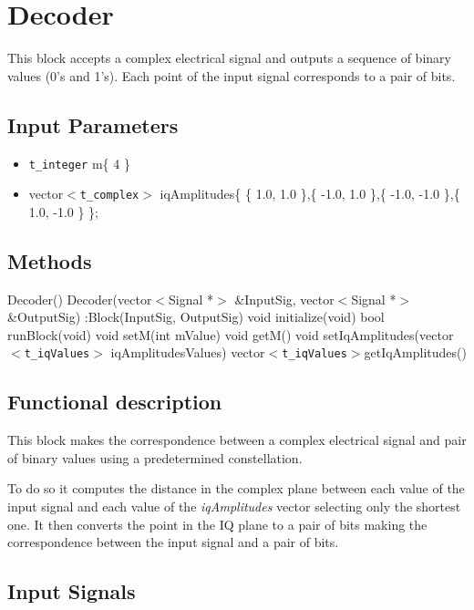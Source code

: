 \clearpage

\section{Decoder}

This block accepts a complex electrical signal and outputs a sequence of binary values (0's and 1's). Each point of the input signal corresponds to a pair of bits.

\subsection*{Input Parameters}

\begin{itemize}
	\item\texttt{t\_integer} m\{ 4 \}
	\item vector$<$\texttt{t\_complex}$>$ iqAmplitudes\{ \{ 1.0, 1.0 \},\{ -1.0, 1.0 \},\{ -1.0, -1.0 \},\{ 1.0, -1.0 \} \};
\end{itemize}

\subsection*{Methods}

Decoder() {}
\bigbreak
Decoder(vector$<$Signal *$>$ \&InputSig, vector$<$Signal *$>$ \&OutputSig) :Block(InputSig, OutputSig) {}
\bigbreak
void initialize(void)
\bigbreak
bool runBlock(void)
\bigbreak
void setM(int mValue)
\bigbreak
void getM()
\bigbreak
void setIqAmplitudes(vector$<$\texttt{t\_iqValues}$>$ iqAmplitudesValues)
\bigbreak
vector$<$\texttt{t\_iqValues}$>$getIqAmplitudes()

\subsection*{Functional description}

This block makes the correspondence between a complex electrical signal and pair of binary values using a predetermined constellation.

To do so it computes the distance in the complex plane between each value of the input signal and each value of the \textit{iqAmplitudes} vector selecting only the shortest one. It then converts the point in the IQ plane to a pair of bits making the correspondence between the input signal and a pair of bits.

\pagebreak

\subsection*{Input Signals}

